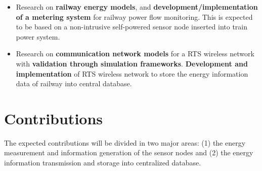 
\begin{itemize}
	\setlength\itemsep{0em}
	
	\item	Research on \textbf{railway energy models}, and \textbf{development/implementation of a metering system} for railway power flow monitoring.
	This is expected to be based on a non-intrusive self-powered sensor node inserted into train power system.

	\item Research on \textbf{communication network models} for a \ac{RTS} wireless network with \textbf{validation through simulation frameworks}.
	\textbf{Development and implementation} of \ac{RTS} wireless network to store the energy information data of railway into central database.

	
\end{itemize}

\newpage
\section{Contributions}

The expected contributions will be divided in two major areas: (1) the energy measurement and information generation of the sensor nodes and (2) the energy information transmission and storage into centralized database.

